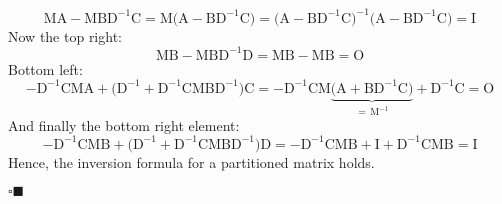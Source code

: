 \documentclass[11pt, a4paper]{scrartcl}
\newcommand{\mat}[1]{\bm{\mathrm{#1}}}
\newcommand{\qedeot}{\hfill\(\square\blacksquare\)}
\begin{document}
			\begin{equation}
				\mat{M} \mat{A} - \mat{M} \mat{B} \mat{D}^{-1} \mat{C}
					= \mat{M} \big( \mat{A} - \mat{B} \mat{D}^{-1} \mat{C} \big)
					= \big( \mat{A} - \mat{B} \mat{D}^{-1} \mat{C} \big)^{-1} \big( \mat{A} - \mat{B} \mat{D}^{-1} \mat{C} \big)
					= \mat{I}
			\end{equation}
			Now the top right:
			\begin{equation}
				\mat{M} \mat{B} - \mat{M} \mat{B} \mat{D}^{-1} \mat{D}
					= \mat{M} \mat{B} - \mat{M} \mat{B}
					= \mat{O}
			\end{equation}
			Bottom left:
			\begin{equation}
				-\mat{D}^{-1} \mat{C} \mat{M} \mat{A} + \big( \mat{D}^{-1} + \mat{D}^{-1} \mat{C} \mat{M} \mat{B} \mat{D}^{-1} \big) \mat{C}
					= -\mat{D}^{-1} \mat{C} \mat{M} \underbrace{\big( \mat{A} + \mat{B} \mat{D}^{-1} \mat{C} \big)}_{=\, \mat{M}^{-1}} + \mat{D}^{-1} \mat{C}
					= \mat{O}
			\end{equation}
			And finally the bottom right element:
			\begin{equation}
				-\mat{D}^{-1} \mat{C} \mat{M} \mat{B} + \big( \mat{D}^{-1} + \mat{D}^{-1} \mat{C} \mat{M} \mat{B} \mat{D}^{-1} \big) \mat{D}
					= -\mat{D}^{-1} \mat{C} \mat{M} \mat{B} + \mat{I} + \mat{D}^{-1} \mat{C} \mat{M} \mat{B}
					= \mat{I}
			\end{equation}
			Hence, the inversion formula for a partitioned matrix holds.

			\qedeot
\end{document}
